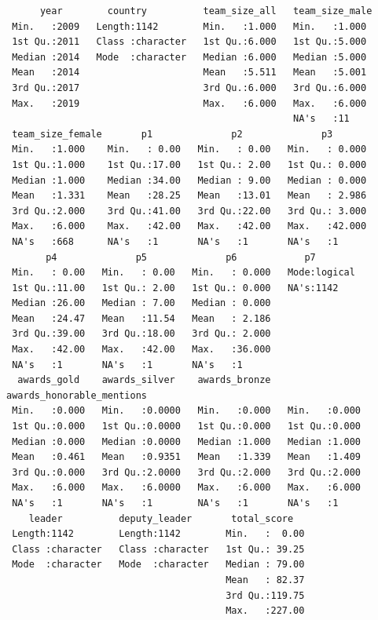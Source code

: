 \documentclass[
  letterpaper,
  DIV=11,
  numbers=noendperiod]{scrartcl}
\begin{document}
\begin{verbatim}
      year        country          team_size_all   team_size_male 
 Min.   :2009   Length:1142        Min.   :1.000   Min.   :1.000  
 1st Qu.:2011   Class :character   1st Qu.:6.000   1st Qu.:5.000  
 Median :2014   Mode  :character   Median :6.000   Median :5.000  
 Mean   :2014                      Mean   :5.511   Mean   :5.001  
 3rd Qu.:2017                      3rd Qu.:6.000   3rd Qu.:6.000  
 Max.   :2019                      Max.   :6.000   Max.   :6.000  
                                                   NA's   :11     
 team_size_female       p1              p2              p3        
 Min.   :1.000    Min.   : 0.00   Min.   : 0.00   Min.   : 0.000  
 1st Qu.:1.000    1st Qu.:17.00   1st Qu.: 2.00   1st Qu.: 0.000  
 Median :1.000    Median :34.00   Median : 9.00   Median : 0.000  
 Mean   :1.331    Mean   :28.25   Mean   :13.01   Mean   : 2.986  
 3rd Qu.:2.000    3rd Qu.:41.00   3rd Qu.:22.00   3rd Qu.: 3.000  
 Max.   :6.000    Max.   :42.00   Max.   :42.00   Max.   :42.000  
 NA's   :668      NA's   :1       NA's   :1       NA's   :1       
       p4              p5              p6            p7         
 Min.   : 0.00   Min.   : 0.00   Min.   : 0.000   Mode:logical  
 1st Qu.:11.00   1st Qu.: 2.00   1st Qu.: 0.000   NA's:1142     
 Median :26.00   Median : 7.00   Median : 0.000                 
 Mean   :24.47   Mean   :11.54   Mean   : 2.186                 
 3rd Qu.:39.00   3rd Qu.:18.00   3rd Qu.: 2.000                 
 Max.   :42.00   Max.   :42.00   Max.   :36.000                 
 NA's   :1       NA's   :1       NA's   :1                      
  awards_gold    awards_silver    awards_bronze   awards_honorable_mentions
 Min.   :0.000   Min.   :0.0000   Min.   :0.000   Min.   :0.000            
 1st Qu.:0.000   1st Qu.:0.0000   1st Qu.:0.000   1st Qu.:0.000            
 Median :0.000   Median :0.0000   Median :1.000   Median :1.000            
 Mean   :0.461   Mean   :0.9351   Mean   :1.339   Mean   :1.409            
 3rd Qu.:0.000   3rd Qu.:2.0000   3rd Qu.:2.000   3rd Qu.:2.000            
 Max.   :6.000   Max.   :6.0000   Max.   :6.000   Max.   :6.000            
 NA's   :1       NA's   :1        NA's   :1       NA's   :1                
    leader          deputy_leader       total_score    
 Length:1142        Length:1142        Min.   :  0.00  
 Class :character   Class :character   1st Qu.: 39.25  
 Mode  :character   Mode  :character   Median : 79.00  
                                       Mean   : 82.37  
                                       3rd Qu.:119.75  
                                       Max.   :227.00  
                                                       

\end{verbatim}
\end{document}
